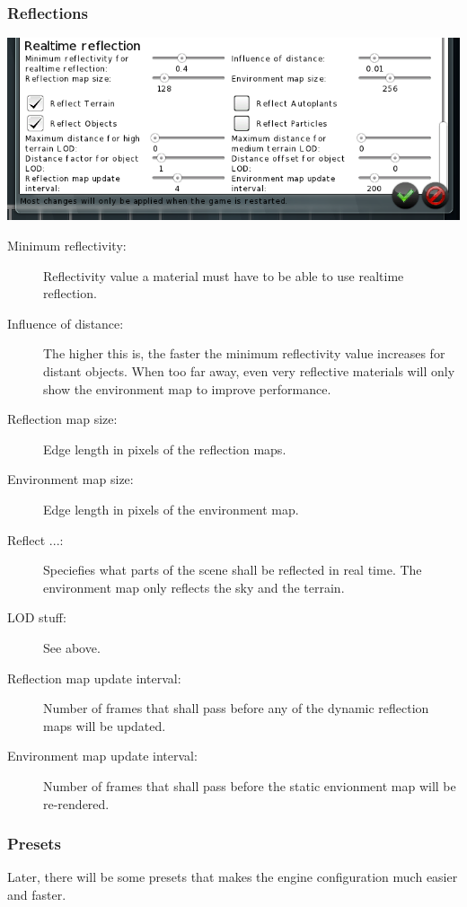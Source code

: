 \documentclass[a4paper]{article}
\begin{document}
\subsubsection{Reflections}
\includegraphics[width=140mm]{./images/settings-reflections.png}
\begin{description}
  \item[Minimum reflectivity:] Reflectivity value a material must have to be able to use realtime reflection.
  \item[Influence of distance:] The higher this is, the faster the minimum reflectivity value increases for distant objects. When too far away, even very reflective materials will only show the environment map to improve performance.
  \item[Reflection map size:] Edge length in pixels of the reflection maps.
  \item[Environment map size:] Edge length in pixels of the environment map.
  \item[Reflect ...:] Speciefies what parts of the scene shall be reflected in real time. The environment map only reflects the sky and the terrain.
  \item[LOD stuff:] See above.
  \item[Reflection map update interval:] Number of frames that shall pass before any of the dynamic reflection maps will be updated.
  \item[Environment map update interval:] Number of frames that shall pass before the static envionment map will be re-rendered.
\end{description}

\pagebreak[4]
\subsubsection{Presets}
Later, there will be some presets that makes the engine configuration much easier and faster.\nopagebreak
\end{document}
